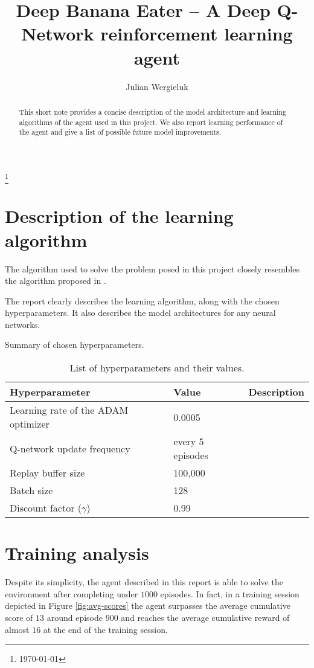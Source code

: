\documentclass[a4paper,draft,11pt]{amsart}
\title{Deep Banana Eater -- A Deep Q-Network reinforcement learning agent}
\author{Julian Wergieluk}\address{}\email{julian.wergieluk@risklab.com}
\begin{document}
\maketitle

\begin{abstract}
This short note provides a concise description of the model architecture and
learning algorithms of the agent used in this project. We also report learning
performance of the agent and give a list of possible future model improvements.
\end{abstract}
\renewcommand*{\thefootnote}{}\footnote{\today{}}

\section{Description of the learning algorithm}

The algorithm used to solve the problem posed in this project closely resembles
the algorithm proposed in \cite{mnih2015humanlevel}.

The report clearly describes the learning algorithm, along with the chosen
hyperparameters.
It also describes the model architectures for any neural networks.

Summary of chosen hyperparameters.

\begin{table}
\caption{List of hyperparameters and their values.}
\begin{tabular}{|l|l|l|}
    \hline
Hyperparameter & Value & Description \\ 
    \hline \hline
    Learning rate of the ADAM optimizer & 0.0005 &  \\
    Q-network update frequency & every 5 episodes &  \\
    Replay buffer size & 100,000 &  \\
    Batch size & 128  &  \\
    Discount factor ($\gamma$) & 0.99 &  \\
    \hline
\end{tabular}
\label{tab:hyperparameters}
\end{table}

\section{Training analysis}

Despite its simplicity, the agent described in this report is able to solve the
environment after completing under $1000$ episodes. In fact, in a training
session depicted in Figure \ref{fig:avg-scores} the agent surpasses the average
cumulative score of $13$ around episode $900$ and reaches the average
cumulative reward of almost $16$ at the end of the training session.
\end{document}
